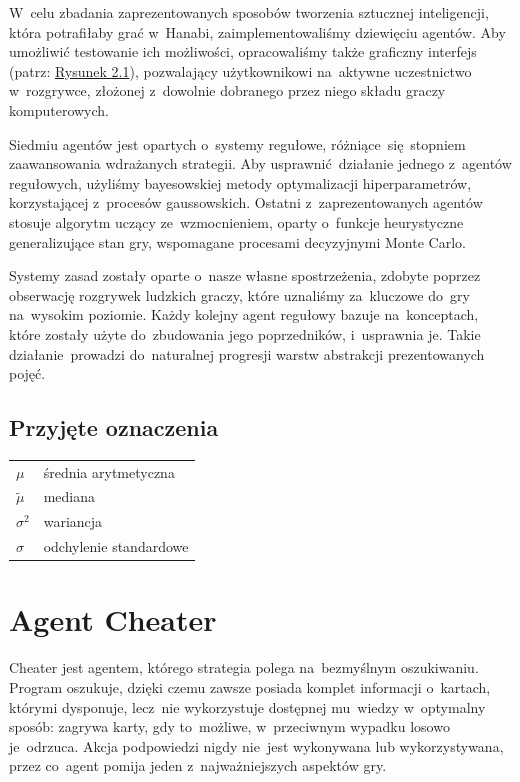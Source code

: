 \documentclass[declaration,shortabstract,inz]{iithesis}
\begin{document}
W~celu zbadania zaprezentowanych sposobów tworzenia sztucznej inteligencji, która potrafiłaby grać w~Hanabi, zaimplementowaliśmy dziewięciu agentów. Aby umożliwić testowanie ich możliwości, opracowaliśmy także graficzny interfejs (patrz: \hyperref[fig:gui]{Rysunek 2.1}), pozwalający użytkownikowi na~aktywne uczestnictwo w~rozgrywce, złożonej z~dowolnie dobranego przez niego składu graczy komputerowych.

Siedmiu agentów jest opartych o~systemy regułowe, różniące~się stopniem zaawansowania wdrażanych strategii. Aby usprawnić działanie jednego z~agentów regułowych, użyliśmy bayesowskiej metody optymalizacji hiperparametrów, korzystającej z~procesów gaussowskich. Ostatni z~zaprezentowanych agentów stosuje algorytm uczący ze~wzmocnieniem, oparty o~funkcje heurystyczne generalizujące stan gry, wspomagane procesami decyzyjnymi Monte Carlo.

Systemy zasad zostały oparte o~nasze własne spostrzeżenia, zdobyte poprzez obserwację rozgrywek ludzkich graczy, które uznaliśmy za~kluczowe do~gry na~wysokim poziomie. Każdy kolejny agent regułowy bazuje na~konceptach, które zostały użyte do~zbudowania jego poprzedników, i~usprawnia je. Takie działanie~prowadzi do~naturalnej progresji warstw abstrakcji prezentowanych pojęć.

\subsection*{Przyjęte oznaczenia}

\begin{tabular}{@{}>{$}l<{$}@{ --- }l@{}}
	\mu & średnia arytmetyczna \\
	\tilde{\mu} & mediana \\
	\sigma^2 & wariancja \\
	\sigma & odchylenie standardowe \\
\end{tabular}

\newpage

\section{Agent Cheater}

Cheater jest agentem, którego strategia polega na~bezmyślnym oszukiwaniu. Program oszukuje, dzięki czemu zawsze posiada komplet informacji o~kartach, którymi dysponuje, lecz~nie wykorzystuje dostępnej mu~wiedzy w~optymalny sposób: zagrywa karty, gdy to~możliwe, w~przeciwnym wypadku losowo je~odrzuca. Akcja podpowiedzi nigdy nie~jest wykonywana lub wykorzystywana, przez co~agent pomija jeden z~najważniejszych aspektów gry.
\end{document}
